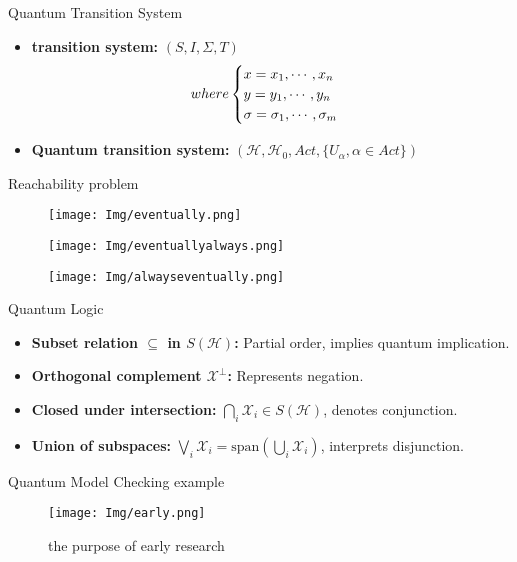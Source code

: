 \documentclass[aspectratio=1610]{beamer}
\begin{document}
\begin{frame}{Quantum Transition System}
    \begin{itemize}
        \item  \textbf{transition system:} $(S, I, \Sigma, T)$
        \begin{equation}
          where
          \begin{cases}
            x = x_1, \cdots, x_n\\
            y = y_1, \cdots, y_n\\
            \sigma = \sigma_1, \cdots, \sigma_m
          \end{cases}
          \notag
        \end{equation}
        \item \textbf{Quantum transition system:} $(\mathcal{H}, \mathcal{H}_0, Act, \{U_\alpha,\alpha\in Act\})$
    \end{itemize}
\end{frame}
\begin{frame}{Reachability problem}
    \begin{figure}
        \texttt{[image: Img/eventually.png]}
    \end{figure}
    \begin{figure}
        \texttt{[image: Img/eventuallyalways.png]}
    \end{figure}
    \begin{figure}
        \texttt{[image: Img/alwayseventually.png]}
    \end{figure}
  \end{frame}
\begin{frame}{Quantum Logic}
    \begin{itemize}
        \item \textbf{Subset relation \( \subseteq \) in \(S(\mathcal{H})\):} Partial order, implies quantum implication.
        \item \textbf{Orthogonal complement \( \mathcal{X}^\perp \):} Represents negation.
        \item \textbf{Closed under intersection:} \( \bigcap_{i} \mathcal{X}_{i} \in S(\mathcal{H}) \), denotes conjunction.
        \item \textbf{Union of subspaces:} \( \bigvee_i \mathcal{X}_i = \text{span} \left( \bigcup_i \mathcal{X}_i \right) \), interprets disjunction.
    \end{itemize}
\end{frame}
\begin{frame}{Quantum Model Checking example}
    \begin{figure}
      \texttt{[image: Img/early.png]}
      \caption{ the purpose of early research}
    \end{figure}
\end{frame}
\end{document}
